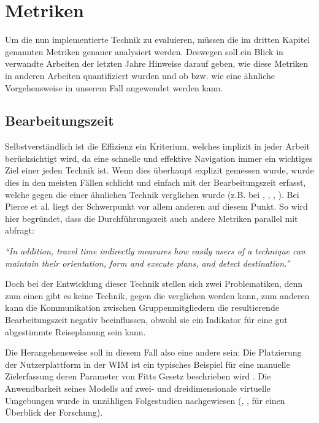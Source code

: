 \section{Metriken}
Um die nun implementierte Technik zu evaluieren, müssen die im dritten Kapitel genannten Metriken genauer analysiert werden. Deswegen soll ein Blick in verwandte Arbeiten der letzten Jahre Hinweise darauf geben, wie diese Metriken in anderen Arbeiten quantifiziert wurden und ob bzw. wie eine ähnliche Vorgehensweise in unserem Fall angewendet werden kann.

\subsection{Bearbeitungszeit}
Selbstverständlich ist die Effizienz ein Kriterium, welches implizit in jeder Arbeit berücksichtigt wird, da eine schnelle und effektive Navigation immer ein wichtiges Ziel einer jeden Technik ist. Wenn dies überhaupt explizit gemessen wurde, wurde dies in den meisten Fällen schlicht und einfach mit der Bearbeitungszeit erfasst, welche gegen die einer ähnlichen Technik verglichen wurde (z.B. bei \cite{Suma2010EvaluationEnvironments}, \cite{Kopper2006DesignEnvironments}, \cite{3_Pierce1997}, \cite{Wingrave2006OvercomingWIM}). 
Bei Pierce et al. \cite{3_Pierce1997} liegt der Schwerpunkt vor allem anderen auf diesem Punkt. So wird hier begründet, dass die Durchführungszeit auch andere Metriken parallel mit abfragt:

\begin{addmargin}[25pt]{0pt} 

\textit{“In addition, travel time indirectly measures how easily users of a technique can maintain their orientation, form and execute plans, and detect destination.”}\cite{3_Pierce1997}

\end{addmargin}

Doch bei der Entwicklung dieser Technik stellen sich zwei Problematiken, denn zum einen gibt es keine Technik, gegen die verglichen werden kann, zum anderen kann die Kommunikation zwischen Gruppenmitgliedern die resultierende Bearbeitungszeit negativ beeinflussen, obwohl sie ein Indikator für eine gut abgestimmte Reiseplanung sein kann.

Die Herangehensweise soll in diesem Fall also eine andere sein:
Die Platzierung der Nutzerplattform in der WIM ist ein typisches Beispiel für eine manuelle Zielerfassung deren Parameter von Fitts Gesetz beschrieben wird \cite{fitts1954information}.
Die Anwendbarkeit seines Modells auf zwei- und dreidimensionale virtuelle Umgebungen wurde in unzähligen Folgestudien nachgewiesen (\cite{mackenzie1992fitts}, \cite{drewes2010only}, \cite{zhai2004characterizing} für einen Überblick der Forschung).

